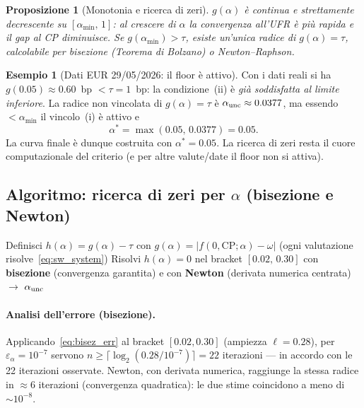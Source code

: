 \documentclass[11pt,a4paper]{article}
\theoremstyle{plain}
\newtheorem{proposizione}[teorema]{Proposizione}
\theoremstyle{definition}
\newtheorem{esempio}[teorema]{Esempio}
\theoremstyle{remark}
\newcommand{\CP}{\mathrm{CP}}
\newcommand{\abs}[1]{\left\lvert #1 \right\rvert}
\begin{document}
\begin{proposizione}[Monotonia e ricerca di zeri]
$g(\alpha)$ \`e continua e strettamente decrescente su $[\alpha_{\min},\,1]$:
al crescere di $\alpha$ la convergenza all'UFR è più rapida e il gap al CP
diminuisce. Se $g(\alpha_{\min})>\tau$, esiste un'unica radice di $g(\alpha)=\tau$,
calcolabile per bisezione (Teorema di Bolzano) o Newton--Raphson.
\end{proposizione}

\begin{esempio}[Dati EUR 29/05/2026: il floor è attivo]
Con i dati reali si ha $g(0.05)\approx 0.60$~bp $<\tau=1$~bp: la condizione~(ii) è
\emph{già soddisfatta al limite inferiore}. La radice non vincolata di
$g(\alpha)=\tau$ è $\alpha_{\rm unc}\approx 0.0377$, ma essendo $<\alpha_{\min}$ il
vincolo~(i) è attivo e
\[
  \boxed{\;\alpha^* = \max(0.05,\,0.0377) = 0.05.\;}
\]
La curva finale è dunque costruita con $\alpha^*=0.05$. La ricerca di zeri resta il
cuore computazionale del criterio (e per altre valute/date il floor non si attiva).
\end{esempio}

\subsection{Algoritmo: ricerca di zeri per $\alpha$ (bisezione e Newton)}

\begin{algorithm}[H]
\caption{Determinazione di $\alpha^*$ (criterio sez.~9.14)}
\label{alg:alpha}
\DontPrintSemicolon
{}
\Input{$\{T_k\}$, $\{r_k\}$, $\omega$, $\CP$, $\tau=10^{-4}$, $\alpha_{\min}=0.05$}
Definisci $h(\alpha) = g(\alpha) - \tau$ con $g(\alpha)=\abs{f(0,\CP;\alpha)-\omega}$
(ogni valutazione risolve~\eqref{eq:sw_system})\;
Risolvi $h(\alpha)=0$ nel bracket $[0.02,\,0.30]$ con \textbf{bisezione}
(convergenza garantita) e con \textbf{Newton} (derivata numerica centrata)
$\longrightarrow$ $\alpha_{\rm unc}$\;
\;
\end{algorithm}

\paragraph{Analisi dell'errore (bisezione).} Applicando~\eqref{eq:bisez_err} al
bracket $[0.02,0.30]$ (ampiezza $\ell=0.28$), per $\varepsilon_\alpha=10^{-7}$
servono $n \ge \lceil\log_2(0.28/10^{-7})\rceil = 22$ iterazioni --- in accordo con
le 22 iterazioni osservate. Newton, con derivata numerica, raggiunge la stessa
radice in $\approx 6$ iterazioni (convergenza quadratica): le due stime coincidono
a meno di $\sim 10^{-8}$.
\end{document}
